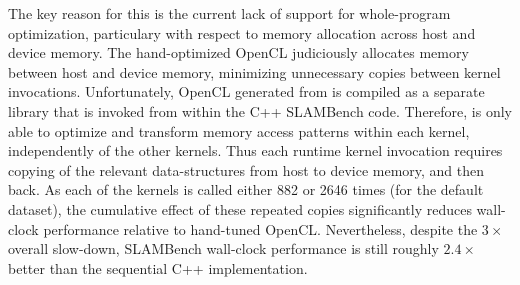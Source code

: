 \documentclass{llncs}
\begin{document}
The key reason for this is the current lack of support for whole-program
optimization, particulary with respect to memory allocation across host
and device memory.
The hand-optimized OpenCL judiciously allocates memory between host and
device memory, minimizing unnecessary copies between kernel invocations.
Unfortunately, OpenCL generated from \pencil is compiled as a separate
library that is invoked from within the C++ SLAMBench code.
Therefore, \PPCG is only able to optimize and transform memory access
patterns within each kernel, independently of the other kernels. 
Thus each runtime kernel invocation requires copying of the relevant
data-structures from host to device memory, and then back. 
As each of the kernels is called either 882 or 2646 times (for the
default dataset), the cumulative effect of these repeated copies
significantly reduces wall-clock performance relative to hand-tuned OpenCL.
Nevertheless, despite the $3\times$ overall slow-down, \pencil SLAMBench
wall-clock performance is still roughly $2.4\times$ better than the
sequential C++ implementation.

\begin{table}[htbp]
\begin{center}
\end{center}
\vskip-0.1cm
\caption{Performance comparison of the PENCIL implementation of
         SLAMBench vs. hand-optimized OpenCL, on ARM Mali-T604.}
\label{SLAMBench_Speedups}
\vskip-0.1cm
\end{table}
\end{document}
